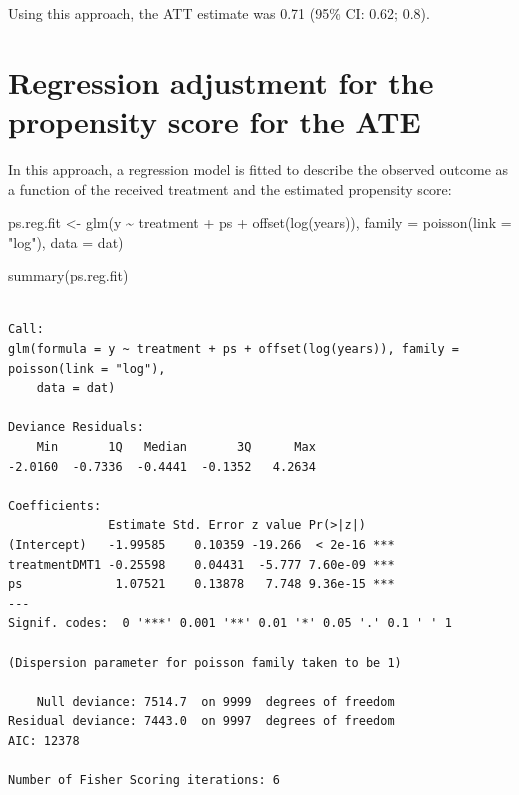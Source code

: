 \documentclass[
  letterpaper,
  DIV=11,
  numbers=noendperiod]{scrreprt}
\newenvironment{Shaded}{\begin{snugshade}}{\end{snugshade}}
\newcommand{\AttributeTok}[1]{\textcolor[rgb]{0.40,0.45,0.13}{#1}}
\newcommand{\FunctionTok}[1]{\textcolor[rgb]{0.28,0.35,0.67}{#1}}
\newcommand{\NormalTok}[1]{\textcolor[rgb]{0.00,0.23,0.31}{#1}}
\newcommand{\OtherTok}[1]{\textcolor[rgb]{0.00,0.23,0.31}{#1}}
\newcommand{\SpecialCharTok}[1]{\textcolor[rgb]{0.37,0.37,0.37}{#1}}
\newcommand{\StringTok}[1]{\textcolor[rgb]{0.13,0.47,0.30}{#1}}
\begin{document}
Using this approach, the ATT estimate was 0.71 (95\% CI: 0.62; 0.8).

\hypertarget{regression-adjustment-for-the-propensity-score-for-the-ate}{%
\section{Regression adjustment for the propensity score for the
ATE}\label{regression-adjustment-for-the-propensity-score-for-the-ate}}

In this approach, a regression model is fitted to describe the observed
outcome as a function of the received treatment and the estimated
propensity score:

\begin{Shaded}
\begin{Highlighting}[]
\NormalTok{ps.reg.fit }\OtherTok{\textless{}{-}} \FunctionTok{glm}\NormalTok{(y }\SpecialCharTok{\textasciitilde{}}\NormalTok{ treatment }\SpecialCharTok{+}\NormalTok{ ps }\SpecialCharTok{+} \FunctionTok{offset}\NormalTok{(}\FunctionTok{log}\NormalTok{(years)),}
                  \AttributeTok{family =} \FunctionTok{poisson}\NormalTok{(}\AttributeTok{link =} \StringTok{"log"}\NormalTok{),}
                  \AttributeTok{data =}\NormalTok{ dat)}

\FunctionTok{summary}\NormalTok{(ps.reg.fit)}
\end{Highlighting}
\end{Shaded}

\begin{verbatim}

Call:
glm(formula = y ~ treatment + ps + offset(log(years)), family = poisson(link = "log"), 
    data = dat)

Deviance Residuals: 
    Min       1Q   Median       3Q      Max  
-2.0160  -0.7336  -0.4441  -0.1352   4.2634  

Coefficients:
              Estimate Std. Error z value Pr(>|z|)    
(Intercept)   -1.99585    0.10359 -19.266  < 2e-16 ***
treatmentDMT1 -0.25598    0.04431  -5.777 7.60e-09 ***
ps             1.07521    0.13878   7.748 9.36e-15 ***
---
Signif. codes:  0 '***' 0.001 '**' 0.01 '*' 0.05 '.' 0.1 ' ' 1

(Dispersion parameter for poisson family taken to be 1)

    Null deviance: 7514.7  on 9999  degrees of freedom
Residual deviance: 7443.0  on 9997  degrees of freedom
AIC: 12378

Number of Fisher Scoring iterations: 6
\end{verbatim}
\end{document}
